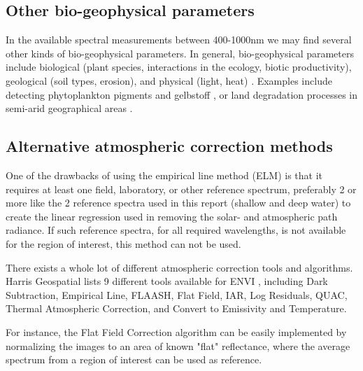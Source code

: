 \subsection{Other bio-geophysical parameters}

In the available spectral measurements between 400-1000nm we may find several 
other kinds of bio-geophysical parameters. In general, bio-geophysical parameters 
include biological (plant species, interactions in the ecology, biotic 
productivity), geological (soil types, erosion), and physical (light, heat) \cite{website:esa_bio-geophysical}. 
Examples include detecting phytoplankton pigments and gelbstoff \cite{Lee:02}, or land degradation 
processes in semi-arid geographical areas \cite{Kaufmann2002}.

\subsection{Alternative atmospheric correction methods}

One of the drawbacks of using the empirical line method (ELM) is that it requires at 
least one field, laboratory, or other reference spectrum, preferably 2 or more like 
the 2 reference spectra used in this report (shallow and deep water) to create the 
linear regression used in removing the solar- and atmospheric path radiance. If such 
reference spectra, for all required wavelengths, is not available for the region of 
interest, this method can not be used. \cite{Karpouzli2003} 

There exists a whole lot of different atmospheric correction tools and algorithms. 
Harris Geospatial lists 9 different tools available for ENVI \cite{website:harrisgeo}, 
including Dark Subtraction, Empirical Line, FLAASH, Flat Field, IAR, Log Residuals, 
QUAC, Thermal Atmospheric Correction, and Convert to Emissivity and Temperature. 

For instance, the Flat Field Correction algorithm can be easily implemented 
by normalizing the images to an area of known "flat" reflectance, where 
the average spectrum from a region of interest can be used as reference.